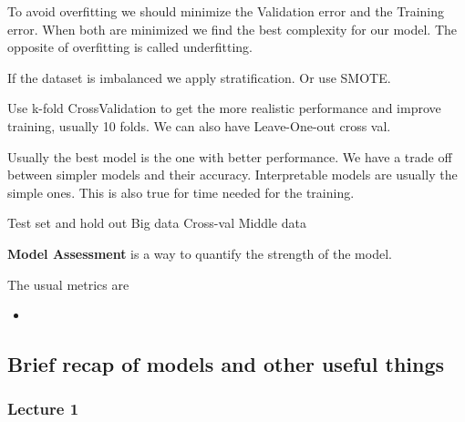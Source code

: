 \vspace{10pt}

To avoid overfitting we should minimize the Validation error and the Training error. When both are minimized we find the best complexity for our model. The opposite of overfitting is called underfitting.

\vspace{10pt}

If the dataset is imbalanced we apply stratification. Or use SMOTE.

\vspace{10pt}

Use k-fold CrossValidation to get the more realistic performance and improve training, usually 10 folds. We can also have Leave-One-out cross val.

\vspace{10pt}

Usually the best model is the one with better performance. We have a trade off between simpler models and their accuracy. Interpretable models are usually the simple ones. This is also true for time needed for the training.


\vspace{10pt}

Test set and hold out \ra Big data
Cross-val \ra Middle data



\textbf{Model Assessment} is a way to quantify the strength of the model.

The usual metrics are

\begin{itemize}
    \item 
\end{itemize}










\subsection{Brief recap of models and other useful things}

\subsubsection{Lecture 1}

